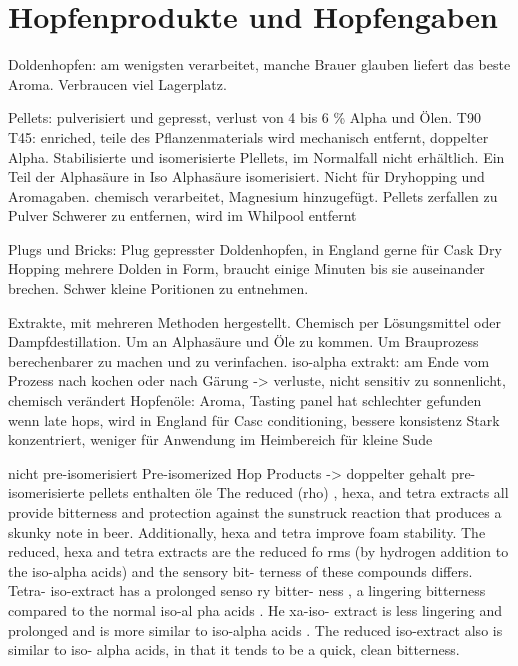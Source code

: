 \documentclass[a4paper,parskip=half]{scrartcl}
\begin{document}
\section*{Hopfenprodukte und Hopfengaben}

\parencite[80\psq]{Garetz1994}
Doldenhopfen: am wenigsten verarbeitet, manche Brauer glauben
liefert das beste Aroma. Verbraucen viel Lagerplatz.

\parencite[82\psqq]{Garetz1994}
Pellets: pulverisiert und gepresst, verlust von 4 bis 6 \% Alpha
und Ölen.
T90
T45: enriched, teile des Pflanzenmaterials wird mechanisch
entfernt, doppelter Alpha.
Stabilisierte und isomerisierte Plellets, im Normalfall nicht
erhältlich. Ein Teil der Alphasäure in Iso Alphasäure
isomerisiert. Nicht für Dryhopping und Aromagaben.
chemisch verarbeitet, Magnesium hinzugefügt.
Pellets zerfallen zu Pulver
Schwerer zu entfernen, wird im Whilpool entfernt \parencite[87]{Garetz1994}

\parencite[84\psq]{Garetz1994}
Plugs und Bricks: 
Plug gepresster Doldenhopfen, in England gerne für Cask Dry Hopping
mehrere Dolden in Form, braucht einige Minuten bis sie auseinander
brechen. Schwer kleine Poritionen zu entnehmen.

\parencite[88-93]{Garetz1994}
Extrakte, mit mehreren Methoden hergestellt. Chemisch per Lösungsmittel
oder Dampfdestillation. Um an Alphasäure und Öle zu kommen.
Um Brauprozess berechenbarer zu machen und zu verinfachen.
iso-alpha extrakt: am Ende vom Prozess nach kochen oder
nach Gärung -> verluste, nicht sensitiv zu sonnenlicht, chemisch verändert
Hopfenöle: Aroma, Tasting panel hat schlechter gefunden wenn
late hops, wird in England für Casc conditioning, bessere konsistenz
Stark konzentriert, weniger für Anwendung im Heimbereich für
kleine Sude

\parencite[52]{Davidson1997}
nicht pre-isomerisiert
Pre-isomerized Hop Products -> doppelter gehalt
pre-isomerisierte pellets enthalten öle
The reduced (rho) , hexa, and tetra extracts
all provide bitterness and protection against
the sunstruck reaction that produces a
skunky note in beer. Additionally, hexa and
tetra improve foam stability.
The
reduced, hexa and tetra extracts are the
reduced fo rms (by hydrogen addition to
the iso-alpha acids) and the sensory bit-
terness of these compounds differs. Tetra-
iso-extract has a prolonged senso ry bitter-
ness , a lingering bitterness compared to
the normal iso-al pha acids . He xa-iso-
extract is less lingering and prolonged and
is more similar to iso-alpha acids . The
reduced iso-extract also is similar to iso-
alpha acids, in that it tends to be a quick,
clean bitterness.
\end{document}
